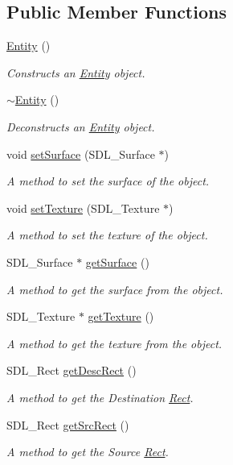 \subsection*{Public Member Functions}
\begin{DoxyCompactItemize}
\item 
\hyperlink{class_entity_a980f368aa07ce358583982821533a54a}{Entity} ()
\begin{DoxyCompactList}\small\item\em Constructs an \hyperlink{class_entity}{Entity} object. \end{DoxyCompactList}\item 
\hyperlink{class_entity_adf6d3f7cb1b2ba029b6b048a395cc8ae}{$\sim$\+Entity} ()
\begin{DoxyCompactList}\small\item\em Deconstructs an \hyperlink{class_entity}{Entity} object. \end{DoxyCompactList}\item 
void \hyperlink{class_entity_a67a6fb32075b44c055f20b9332068cf8}{set\+Surface} (S\+D\+L\+\_\+\+Surface $\ast$)
\begin{DoxyCompactList}\small\item\em A method to set the surface of the object. \end{DoxyCompactList}\item 
void \hyperlink{class_entity_aaae0b0b28be4497af93cf2277662770b}{set\+Texture} (S\+D\+L\+\_\+\+Texture $\ast$)
\begin{DoxyCompactList}\small\item\em A method to set the texture of the object. \end{DoxyCompactList}\item 
S\+D\+L\+\_\+\+Surface $\ast$ \hyperlink{class_entity_a3544323cdb2083bedbfa7f04e5cdaecf}{get\+Surface} ()
\begin{DoxyCompactList}\small\item\em A method to get the surface from the object. \end{DoxyCompactList}\item 
S\+D\+L\+\_\+\+Texture $\ast$ \hyperlink{class_entity_a25b50625a770e24dcafc25aa505fc54d}{get\+Texture} ()
\begin{DoxyCompactList}\small\item\em A method to get the texture from the object. \end{DoxyCompactList}\item 
S\+D\+L\+\_\+\+Rect \hyperlink{class_entity_ae113498b7c37c80a814f0d92444ebf50}{get\+Desc\+Rect} ()
\begin{DoxyCompactList}\small\item\em A method to get the Destination \hyperlink{struct_rect}{Rect}. \end{DoxyCompactList}\item 
S\+D\+L\+\_\+\+Rect \hyperlink{class_entity_a85faf9891defd68e4404178cc79a6419}{get\+Src\+Rect} ()
\begin{DoxyCompactList}\small\item\em A method to get the Source \hyperlink{struct_rect}{Rect}. \end{DoxyCompactList}\end{DoxyCompactItemize}
